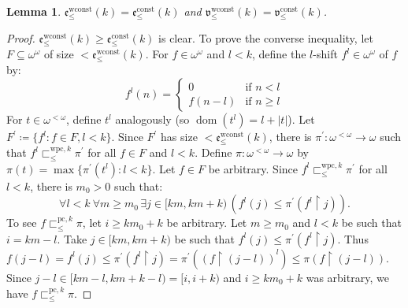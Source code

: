 \documentclass[a4paper,12pt]{amsart}
\newtheorem{lem}[thm]{Lemma}
\theoremstyle{definition}
\numberwithin{thm}{section}
\numberwithin{equation}{section}
\newcommand{\oo}{{\omega}^\omega}
\newcommand{\fsq}{\omega^{<\omega}}
\newcommand{\on}{\mathpunct{\upharpoonright}}
\newcommand{\ee}{\mathfrak{e}}
\DeclareMathOperator{\dom}{dom}
\newcommand{\vv}{\mathfrak{v}}
\begin{document}
    \begin{lem}\label{lem:weakly_constant_prediction}
        $\ee^\mathrm{wconst}_{\leq}(k)=\ee^\mathrm{const}_{\leq}(k)$ and $\vv^\mathrm{wconst}_{\leq}(k)=\vv^\mathrm{const}_{\leq}(k)$.
    \end{lem}
    \begin{proof}
        $\ee^\mathrm{wconst}_{\leq}(k)\geq\ee^\mathrm{const}_{\leq}(k)$ is clear. To prove the converse inequality, let $F\subseteq\oo$ of size $<\ee^\mathrm{wconst}_{\leq}(k)$. For $f\in\oo$ and $l<k$, define the $l$-shift $f^l\in\oo$ of $f$ by:
        \begin{equation*}
    		f^l(n)=
    		\begin{cases}
    			0 & \text{if }n<l \\
    			f(n-l)         &\text{if }n\geq l
    		\end{cases}
    	\end{equation*}
        For $t\in\fsq$, define $t^l$ analogously (so $\dom(t^l)=l+|t|$). Let $F^\prime\coloneqq\{f^l:f\in F, l<k\}$. Since $F^\prime$ has size $<\ee^\mathrm{wconst}_{\leq}(k)$, there is $\pi^\prime\colon\fsq\to\omega$ such that $f^l\sqsubset^{\mathrm{wpc}, k}_{\leq}\pi^\prime$ for all $f\in F$ and $l<k$. Define $\pi\colon\fsq\to\omega$ by $\pi(t)=\max\{\pi^\prime(t^l):l<k\}$. 
        Let $f\in F$ be arbitrary.
        Since $f^l\sqsubset^{\mathrm{wpc}, k}_{\leq}\pi^\prime$ for all $l<k$, there is $m_0>0$ such that:
        \[\forall l<k~\forall m\geq m_0\,\exists j\in[km, km+k)\,(f^l(j)\leq\pi^\prime(f^l\upharpoonright j)).\]
        To see $f\sqsubset^{\mathrm{pc}, k}_{\leq}\pi$, let $i\geq km_0+k$ be arbitrary. Let $m\geq m_0$ and $l<k$ be such that $i=km-l$. Take $j\in [km, km+k)$ be such that $f^l(j)\leq\pi^\prime(f^l\on j)$.
        Thus $f(j-l)=f^l(j)\leq\pi^\prime(f^l\on j)=\pi^\prime((f\on (j-l))^l)\leq\pi(f\on (j-l))$.
        Since $j-l\in [km-l, km+k-l)=[i,i+k)$ and $i\geq km_0+k$ was arbitrary, we have $f\sqsubset^{\mathrm{pc}, k}_{\leq}\pi$.
    \end{proof}
\end{document}
